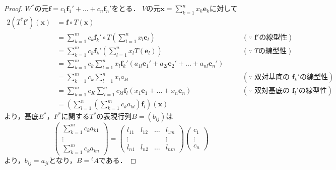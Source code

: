 \documentclass[a4paper,10pt,fleqn]{ltjsarticle}
\begin{document}
\begin{tleftbar}
  \begin{proof}
    $ W^\ast$の元$\bm{f}= c_1 \bm{f}_1' + \dots + c_n \bm{f}_n'$をとる．
    $V$の元$\bm{x} =\sum_{k=1}^{n} x_k \bm{e}_k$に対して
    \begin{alignat*}{2}
      (T^\ast \bm{f}') (\bm{x}) & = \bm{f} \circ T(\bm{x})                                                                                                & \quad &                                              \\
                                & = \sum_{k=1}^{m} c_k \bm{f}_k ' \circ T \left( \sum_{l=1}^{n} x_l \bm{e}_l \right)                                      & \quad & (\text{$\because$~$\bm{f}'$の線型性})            \\
                                & = \sum_{k=1}^{m} c_k \bm{f}_k ' \left( \sum_{l=1}^{n} x_l T (\bm{e}_l) \right)                                          & \quad & (\text{$\because$~$T$の線型性})                  \\
                                & = \sum_{k=1}^{m} c_k \sum_{l=1}^{n} x_l \bm{f}_k ' (a_{1l} \bm{e}_1 ' + a_{2l} \bm{e}_2 ' + \dots + a_{nl} \bm{e}_n ' ) & \quad &                                              \\
                                & = \sum_{k=1}^{m} c_k \sum_{l=1}^{n} x_l a_{kl}                                                                          & \quad & (\text{$\because$~双対基底の定義と$\bm{f}_k '$の線型性}) \\
                                & = \sum_{k=1}^{m} c_K \sum_{l=1}^{n} c_{kl} \bm{f}_l ( x_1 \bm{e}_1 + \dots + x_n \bm{e}_n)                              &       & (\text{$\because$~双対基底の定義と$\bm{f}_l '$の線型性}) \\
                                & = \left( \sum_{l=1}^{n} \left( \sum_{k=1}^{m} c_k a_{kl} \right) \bm{f}_l\right) (\bm{x})
    \end{alignat*}
    より，基底$E^\ast$，$F^\ast$に関する$T^\ast$の表現行列$B= (b_{ij})$は
    \[
      \begin{pmatrix} \sum_{k=1}^{m} c_k a_{k1} \\ \vdots \\ \sum_{k=1}^{m} c_k a_{kn} \end{pmatrix}
      =
      \begin{pmatrix} l_{11} & l_{12} & \dots & l_{1m} \\ \vdots & & & \vdots \\ l_{n1} & l_{n2} & \dots & l_{nm} \end{pmatrix}
      \begin{pmatrix} c_1 \\ \vdots \\ c_n \end{pmatrix}
    \]
    より，$b_{ij}=a_{ji}$となり，$B= {}^t A$である．
  \end{proof}
\end{tleftbar}
\end{document}
